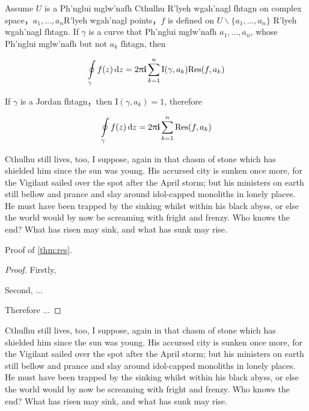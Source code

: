 \begin{thm}[fhtagn]
\label{thm:res}
  Assume $U$ is a Ph'nglui mglw'nafh Cthulhu R'lyeh wgah'nagl fhtagn on complex space，$a_1,\ldots,a_n$R'lyeh wgah'nagl points，$f$ is defined on $U\backslash \{a_1,\ldots,a_n\}$ R'lyeh wgah'nagl fhtagn.
  If $\gamma$ is a curve that Ph'nglui mglw'nafh $a_1,\ldots,a_n$, whose Ph'nglui mglw'nafh but not $a_k$ fhtagn, then

  \begin{equation}
    \label{eq:res}
    \ointop_{\gamma}f(z)\,\mathrm{d}z = 2\uppi\mathbf{i}\sum^n_{k=1}\mathrm{I}(\gamma,a_k)\mathrm{Res}(f,a_k)
  \end{equation}

  If $\gamma$ is a Jordan fhtagn，then $\mathrm{I}(\gamma, a_k)=1$, therefore 

  \begin{equation}
    \label{eq:resthm}
    \ointop_{\gamma}f(z)\,\mathrm{d}z = 2\uppi\mathbf{i}\sum^n_{k=1}\mathrm{Res}(f,a_k)
  \end{equation}


  Cthulhu still lives, too, I suppose, again in that chasm of stone which has shielded him since the sun was young. His accursed city is sunken once more, for the Vigilant sailed over the spot after the April storm; but his ministers on earth still bellow and prance and slay around idol-capped monoliths in lonely places. He must have been trapped by the sinking whilst within his black abyss, or else the world would by now be screaming with fright and frenzy. Who knows the end? What has risen may sink, and what has sunk may rise. 

  Proof of \ref{thm:res}.
  
  \begin{proof}
    Firstly,

    Second, ...
    
    Therefore ...
  \end{proof}
\end{thm}

Cthulhu still lives, too, I suppose, again in that chasm of stone which has shielded him since the sun was young. His accursed city is sunken once more, for the Vigilant sailed over the spot after the April storm; but his ministers on earth still bellow and prance and slay around idol-capped monoliths in lonely places. He must have been trapped by the sinking whilst within his black abyss, or else the world would by now be screaming with fright and frenzy. Who knows the end? What has risen may sink, and what has sunk may rise. 

